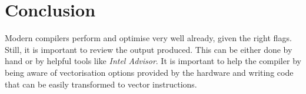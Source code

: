 \documentclass[letterpaper,twocolumn,10pt]{article}
\begin{document}
\section*{Conclusion}
\vspace{-0.1in}
Modern compilers perform and optimise very well already, given the right flags.
Still, it is important to review the output produced. This can be either done by hand or by helpful tools like \textit{Intel Advisor}.
It is important to help the compiler by being aware of vectorisation options provided by the hardware and writing code that can be easily transformed to vector instructions.





\end{document}
